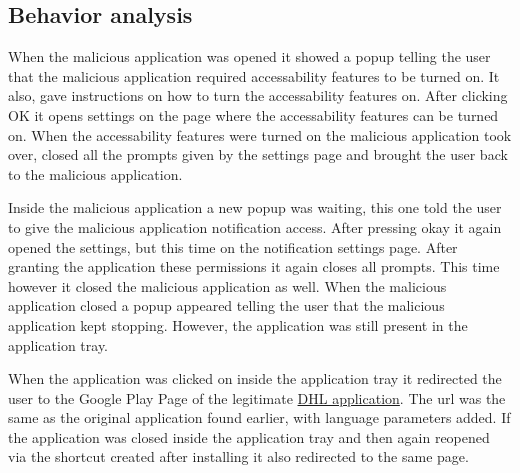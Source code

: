 \subsection{Behavior analysis}

When the malicious application was opened it showed a popup telling the user that the malicious application required accessability features to be turned on.
It also, gave instructions on how to turn the accessability features on.
After clicking OK it opens settings on the page where the accessability features can be turned on. 
When the accessability features were turned on the malicious application took over, closed all the prompts given by the settings page and brought the user back to the malicious application.

Inside the malicious application a new popup was waiting, this one told the user to give the malicious application notification access. After pressing okay it again opened the settings, but this time on the notification settings page. After granting the application these permissions it again closes all prompts. 
This time however it closed the malicious application as well.
When the malicious application closed a popup appeared telling the user that the malicious application kept stopping.
However, the application was still present in the application tray.

When the application was clicked on inside the application tray it redirected the user to the Google Play Page of the legitimate \href{https://play.google.com/store/apps/details?id=com.dhl.exp.dhlmobile&hl=en&gl=US}{DHL application}.
The url was the same as the original application found earlier, with language parameters added.
If the application was closed inside the application tray and then again reopened via the shortcut created after installing it also redirected to the same page.


